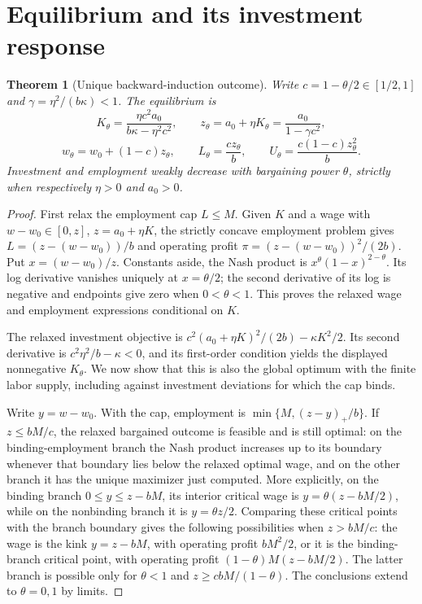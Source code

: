 \documentclass[11pt,a4paper]{article}
\newtheorem{theorem}{Theorem}[section]
\theoremstyle{remark}
\begin{document}
\section{Equilibrium and its investment response}
\begin{theorem}[Unique backward-induction outcome]
Write $c=1-\theta/2\in[1/2,1]$ and $\gamma=\eta^2/(b\kappa)<1$. The equilibrium is
\[
 K_\theta=\frac{\eta c^2a_0}{b\kappa-\eta^2c^2},\qquad
 z_\theta=a_0+\eta K_\theta=\frac{a_0}{1-\gamma c^2},
\]
\[
 w_\theta=w_0+(1-c)z_\theta,\qquad
 L_\theta=\frac{c z_\theta}{b},\qquad
 U_\theta=\frac{c(1-c)z_\theta^2}{b}.
\]
Investment and employment weakly decrease with bargaining power $\theta$, strictly when respectively $\eta>0$ and $a_0>0$.
\end{theorem}
\begin{proof}
First relax the employment cap $L\le M$. Given $K$ and a wage with $w-w_0\in[0,z]$, $z=a_0+\eta K$, the strictly concave employment problem gives $L=(z-(w-w_0))/b$ and operating profit $\pi=(z-(w-w_0))^2/(2b)$. Put $x=(w-w_0)/z$. Constants aside, the Nash product is $x^\theta(1-x)^{2-\theta}$. Its log derivative vanishes uniquely at $x=\theta/2$; the second derivative of its log is negative and endpoints give zero when $0<\theta<1$. This proves the relaxed wage and employment expressions conditional on $K$.

The relaxed investment objective is $c^2(a_0+\eta K)^2/(2b)-\kappa K^2/2$. Its second derivative is $c^2\eta^2/b-\kappa<0$, and its first-order condition yields the displayed nonnegative $K_\theta$. We now show that this is also the global optimum with the finite labor supply, including against investment deviations for which the cap binds.

Write $y=w-w_0$. With the cap, employment is $\min\{M,(z-y)_+/b\}$. If $z\le bM/c$, the relaxed bargained outcome is feasible and is still optimal: on the binding-employment branch the Nash product increases up to its boundary whenever that boundary lies below the relaxed optimal wage, and on the other branch it has the unique maximizer just computed. More explicitly, on the binding branch $0\le y\le z-bM$, its interior critical wage is $y=\theta(z-bM/2)$, while on the nonbinding branch it is $y=\theta z/2$. Comparing these critical points with the branch boundary gives the following possibilities when $z>bM/c$: the wage is the kink $y=z-bM$, with operating profit $bM^2/2$, or it is the binding-branch critical point, with operating profit $(1-\theta)M(z-bM/2)$. The latter branch is possible only for $\theta<1$ and $z\ge cbM/(1-\theta)$. The conclusions extend to $\theta=0,1$ by limits.


\end{proof}
\end{document}
